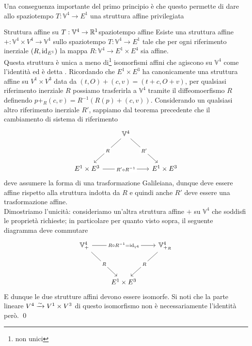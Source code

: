 \documentclass[openany]{book}
\renewcommand\V{\mathbb{V}}
\begin{document}
Una conseguenza importante del primo principio è che questo permette di dare allo spaziotempo $T:\V^4\to E^1$ una struttura affine privilegiata 

\begin{theorem}{Struttura affine su $T:\V^4\to\R^1$}{spaziotempo affine}
    Esiste una struttura affine $+:\V^4\times V^4 \to \V^4$ sullo spaziotempo $T:\V^4\to E^1$ tale che per ogni riferimento inerziale $(R,\operatorname{id}_{E^1})$ la mappa $R:\V^4\to E^1\times E^4$ sia affine.\\
    Questa struttura è unica a meno di\footnote{non unici} isomorfismi affini che agiscono su $\V^4$ come l'identità ed è detta .
    \proof 
    Ricordando che $E^1\times E^3$ ha canonicamente una struttura affine su $V^1\times V^3$ data da $(t,O)+(c,v) = (t+c, O+v)$, per qualsiasi riferimento inerziale $R$ possiamo trasferirla a $\V^4$ tramite il diffeomoerfismo $R$ definendo $ p +_R (c,v) = R^{-1}(R(p) + (c,v))$. Considerando un qualsiasi altro riferimento inerziale $R'$, sappiamo dal teorema precedente che il cambiamento di sistema di riferimento
    \[\begin{tikzcd}
    	& {\V^4} & \\
	    \\
	    {E^1\times E^3} && {E^1\times E^3}
	    \arrow["R"{description}, from=1-2, to=3-1]
	    \arrow["{R'}"{description}, from=1-2, to=3-3]
	    \arrow["{R'\circ R^{-1}}"{description}, from=3-1, to=3-3]
    \end{tikzcd}\]
    deve assumere la forma di una trasformazione Galileiana, dunque deve essere affine rispetto alla struttura indotta da $R$ e quindi anche $R'$ deve essere una trasformazione affine.\\
    Dimostriamo l'unicità: consideriamo un'altra struttura affine $+$ su $\V^4$ che soddisfi le proprietà richieste; in particolare per quanto visto sopra, il seguente diagramma deve commutare
    \[\begin{tikzcd}
    	{\V^4_+} && {\V^4_{+_R}} \\
	    \\
	    & {E^1\times E^3}
	    \arrow["{R\circ R^{-1} = \id_{\V^4}}"{description}, from=1-1, to=1-3]
	    \arrow["R"{description}, from=1-1, to=3-2]
	    \arrow["R"{description}, from=1-3, to=3-2]
    \end{tikzcd}\]
    E dunque le due strutture affini devono essere isomorfe. Si noti che la parte lineare $V^4\xrightarrow{\sim} V^1\times V^3$ di questo isomorfismo non è necessariamente l'identità però.
    \qed
\end{theorem}
\end{document}
